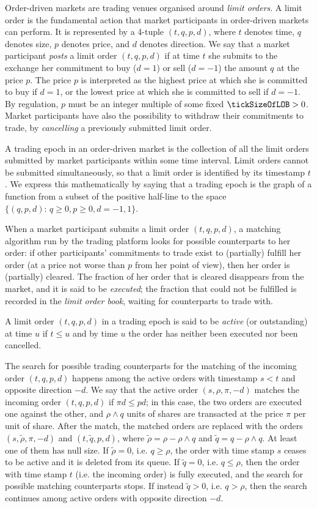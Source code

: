 Order-driven markets are trading venues organised around \emph{limit orders}.
A limit order is the fundamental action that market participants in order-driven markets can perform.
It is represented by a 4-tuple $(t,q,p,d)$,
where $t$ denotes time, $q$ denotes size, $p$ denotes price, and $d$ denotes direction.
We say that a market participant \emph{posts} a limit order $(t,q,p,d)$
if at time $t$ she submits to the exchange her commitment to buy ($d=1$) or sell ($d=-1$)
the amount $q$ at the price $p$.
The price $p$ is interpreted as the highest price at which she is committed to buy if $d=1$,
or the lowest price at which she is committed to sell if $d=-1$.
By regulation, $p$ must be an integer multiple of some fixed $\tickSizeOfLOB>0$.
Market participants have also the possibility to withdraw their commitments to trade,
by \emph{cancelling} a previously submitted limit order.

A trading epoch in an order-driven market is the collection of all the limit orders
submitted by market participants within some time interval.
Limit orders cannot be submitted simultaneously,
so that a limit order is identified by its timestamp $t$.
We express this mathematically by saying that a trading epoch is the graph of a function
from a subset of the positive half-line to the space
$\lbrace (q,p,d): \, q\geq0, p\geq0, d=-1,1\rbrace$.

When a market participant submits a limit order $(t,q,p,d)$,
a matching algorithm run by the trading platform looks for possible counterparts to her order:
if other participants' commitments to trade exist to (partially) fulfill her order
(at a price not worse than $p$ from her point of view),
then her order is (partially) cleared.
The fraction of her order that is cleared disappears from the market,
and it is said to be \emph{executed};
the fraction that could not be fulfilled is recorded in the \emph{limit order book},
waiting for counterparts to trade with.

A limit order $(t,q,p,d)$ in a trading epoch is said to be \emph{active} (or outstanding) at time $u$
if $t\leq u$ and by time $u$ the order has neither been executed nor been cancelled.

The search for possible trading counterparts for the matching of the incoming order $(t,q,p,d)$
happens among the active orders with timestamp $s<t$ and opposite direction $-d$.
We say that the active order $(s,\rho,\pi,-d)$ matches the incoming order $(t,q,p,d)$
if
$\pi d \leq p d$;
in this case, the two orders are executed one against the other,
and $\rho \wedge q$ units of shares are transacted at the price $\pi$ per unit of share.
After the match, the matched orders are replaced with the orders
$(s,\tilde{\rho}, \pi, -d)$ and $(t,\tilde{q}, p, d)$,
where $\tilde{\rho} = \rho - \rho \wedge q$
and $\tilde{q} = q - \rho \wedge q$.
At least one of them has null size.
If $\tilde{\rho} = 0$, i.e. $q \geq \rho$,
the order with time stamp $s$ ceases to be active and it is deleted from its queue.
If $\tilde{q} = 0$, i.e. $q\leq \rho$,
then the order with time stamp $t$ (i.e. the incoming order) is fully executed,
and the search for possible matching counterparts stops.
If instead $\tilde{q} > 0$, i.e. $q>\rho$,
then the search continues among active orders with opposite direction $-d$.

